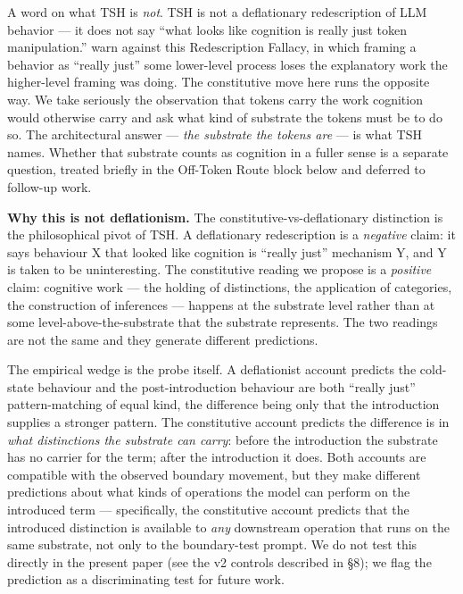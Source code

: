 \documentclass[11pt,a4paper]{article}
\begin{document}
A word on what TSH is \textit{not}. TSH is not a deflationary redescription of LLM behavior --- it does not say ``what looks like cognition is really just token manipulation.'' \citet{milliere2024interface} warn against this Redescription Fallacy, in which framing a behavior as ``really just'' some lower-level process loses the explanatory work the higher-level framing was doing. The constitutive move here runs the opposite way. We take seriously the observation that tokens carry the work cognition would otherwise carry and ask what kind of substrate the tokens must be to do so. The architectural answer --- \textit{the substrate the tokens are} --- is what TSH names. Whether that substrate counts as cognition in a fuller sense is a separate question, treated briefly in the Off-Token Route block below and deferred to follow-up work.

\textbf{Why this is not deflationism.} The constitutive-vs-deflationary distinction is the philosophical pivot of TSH. A deflationary redescription is a \textit{negative} claim: it says behaviour X that looked like cognition is ``really just'' mechanism Y, and Y is taken to be uninteresting. The constitutive reading we propose is a \textit{positive} claim: cognitive work --- the holding of distinctions, the application of categories, the construction of inferences --- happens at the substrate level rather than at some level-above-the-substrate that the substrate represents. The two readings are not the same and they generate different predictions.

The empirical wedge is the probe itself. A deflationist account predicts the cold-state behaviour and the post-introduction behaviour are both ``really just'' pattern-matching of equal kind, the difference being only that the introduction supplies a stronger pattern. The constitutive account predicts the difference is in \textit{what distinctions the substrate can carry}: before the introduction the substrate has no carrier for the term; after the introduction it does. Both accounts are compatible with the observed boundary movement, but they make different predictions about what kinds of operations the model can perform on the introduced term --- specifically, the constitutive account predicts that the introduced distinction is available to \textit{any} downstream operation that runs on the same substrate, not only to the boundary-test prompt. We do not test this directly in the present paper (see the v2 controls described in \S8); we flag the prediction as a discriminating test for future work.
\end{document}
